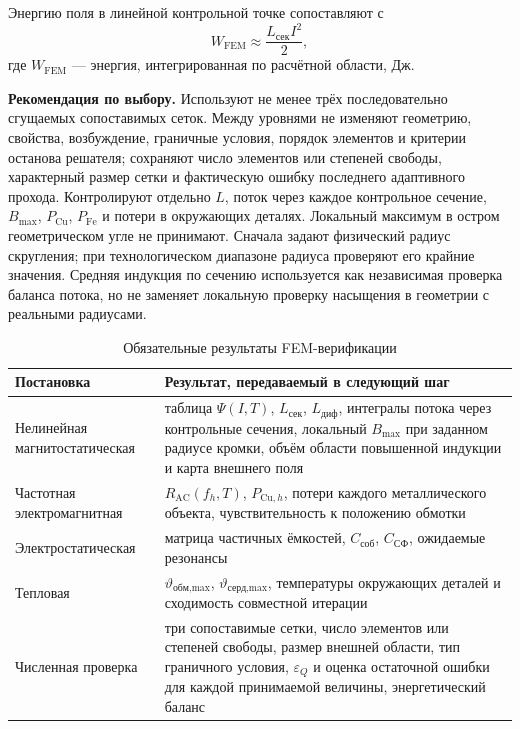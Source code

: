 \documentclass[14pt,a4paper]{extarticle}
\newcommand{\recommend}{\par\noindent\textbf{Рекомендация по выбору.} }
\begin{document}
Энергию поля в линейной контрольной точке сопоставляют с
\begin{equation}
 W_{\text{FEM}}\approx\frac{L_{\text{сек}}I^2}{2},
 \label{eq:fem-energy-check}
\end{equation}
где $W_{\text{FEM}}$ --- энергия, интегрированная по расчётной области,
Дж.

\recommend Используют не менее трёх последовательно сгущаемых сопоставимых
сеток. Между уровнями не изменяют геометрию, свойства, возбуждение,
граничные условия, порядок элементов и критерии останова решателя;
сохраняют число элементов или степеней свободы, характерный размер сетки и
фактическую ошибку последнего адаптивного прохода. Контролируют отдельно
$L$, поток через каждое контрольное сечение, $B_{\max}$,
$P_{\text{Cu}}$, $P_{\text{Fe}}$ и потери в окружающих деталях.
Локальный максимум в остром геометрическом угле не принимают. Сначала
задают физический радиус скругления; при технологическом диапазоне радиуса
проверяют его крайние значения. Средняя индукция по сечению используется
как независимая проверка баланса потока, но не заменяет локальную проверку
насыщения в геометрии с реальными радиусами.

\begin{table}[H]
\caption{Обязательные результаты FEM-верификации}
\label{tab:fem-results}
\centering
\small
\begin{tabularx}{\textwidth}{>{\raggedright\arraybackslash}p{50mm} X}
\toprule
Постановка & Результат, передаваемый в следующий шаг \\
\midrule
Нелинейная магнитостатическая &
таблица $\Psi(I,T)$, $L_{\text{сек}}$, $L_{\text{диф}}$, интегралы потока
через контрольные сечения, локальный $B_{\max}$ при заданном радиусе
кромки, объём области повышенной индукции и карта внешнего поля \\
Частотная электромагнитная &
$R_{\text{AC}}(f_h,T)$, $P_{\text{Cu},h}$, потери каждого металлического
объекта, чувствительность к положению обмотки \\
Электростатическая &
матрица частичных ёмкостей, $C_{\text{соб}}$, $C_{\text{СФ}}$, ожидаемые
резонансы \\
Тепловая &
$\vartheta_{\text{обм,max}}$, $\vartheta_{\text{серд,max}}$, температуры
окружающих деталей и сходимость совместной итерации \\
Численная проверка &
три сопоставимые сетки, число элементов или степеней свободы, размер
внешней области, тип граничного условия, $\varepsilon_Q$ и оценка
остаточной ошибки для каждой принимаемой величины, энергетический баланс \\
\bottomrule
\end{tabularx}
\end{table}
\end{document}
